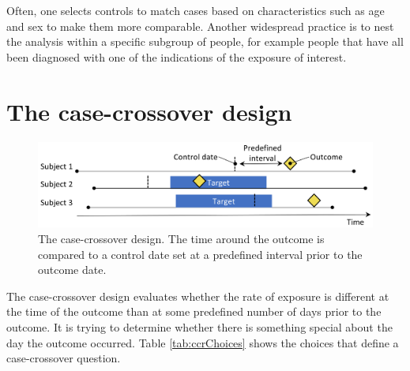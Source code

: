 \documentclass[]{book}
\begin{document}
Often, one selects controls to match cases based on characteristics such as age and sex to make them more comparable. Another widespread practice is to nest the analysis within a specific subgroup of people, for example people that have all been diagnosed with one of the indications of the exposure of interest.

\hypertarget{the-case-crossover-design}{%
\section{The case-crossover design}\label{the-case-crossover-design}}


\begin{figure}

{\centering \includegraphics[width=0.9\linewidth]{images/PopulationLevelEstimation/caseCrossover} 

}

\caption{The case-crossover design. The time around the outcome is compared to a control date set at a predefined interval prior to the outcome date.}\label{fig:caseCrossover}
\end{figure}

The case-crossover \citep{maclure_1991} design evaluates whether the rate of exposure is different at the time of the outcome than at some predefined number of days prior to the outcome. It is trying to determine whether there is something special about the day the outcome occurred. Table \ref{tab:ccrChoices} shows the choices that define a case-crossover question.  
\end{document}
